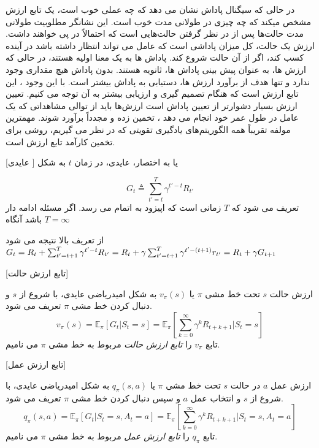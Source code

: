 در حالی که سیگنال پاداش نشان می دهد که چه عملی خوب است، یک تابع ارزش مشخص می\nf کند که چه چیزی در طولانی مدت خوب است. این نشانگر مطلوبیت طولانی مدت حالت‌ها پس از در نظر گرفتن حالت‌هایی است که احتمالاً در پی خواهند داشت.
ارزش یک حالت، کل میزان پاداشی است که عامل می تواند انتظار داشته باشد در آینده کسب کند، اگر از آن حالت شروع کند.
پاداش ها به یک معنا اولیه هستند، در حالی که ارزش ها، به عنوان پیش بینی پاداش ها، ثانویه هستند. بدون پاداش هیچ مقداری وجود ندارد و تنها هدف از برآورد ارزش ها، دستیابی به پاداش بیشتر است. با این وجود ، این تابع ارزش است که هنگام تصمیم گیری و ارزیابی بیشتر به آن توجه می کنیم.
تعیین ارزش‌ بسیار دشوارتر از تعیین پاداش است
ارزش‌ها باید از توالی مشاهداتی که یک عامل در طول عمر خود انجام می دهد ، تخمین زده و مجدداً برآورد شوند.
مهمترین مولفه تقریباً همه الگوریتم‌های یادگیری تقویتی که در نظر می گیریم، روشی برای تخمین کارآمد تابع ارزش است.

[عایدی ]
 یا به اختصار، عایدی، در زمان $t$ به شکل

$$G_t \triangleq \sum_{t'=t}^{T} \gamma^{t'-t} R_{t'}$$
تعریف می شود که $T$ زمانی است که اپیزود به اتمام می رسد. اگر مسئله ادامه دار باشد آنگاه 
$T=\infty$

از تعریف بالا نتیجه می شود 
$G_t = R_t + \sum_{t'=t+1}^{T} \gamma^{t'-t} R_{t'} \\
= R_t + \gamma \sum_{t'=t+1}^{T} \gamma^{t' - (t+1)} r_{t'} \\
= R_t + \gamma G_{t+1} \\
$

[تابع ارزش حالت]

 ارزش حالت $s$ تحت خط مشی $\pi$ یا $v_\pi(s)$ به شکل امیدریاضی عایدی، با شروع از $s$ و دنبال کردن خط مشی $\pi$ تعریف می شود.
$$v_\pi(s) = \mathbb{E}_\pi\left[G_t| S_t=s\right] = \mathbb{E}_\pi\left[\sum_{k=0}^{\infty} \gamma^k R_{t+k+1}|S_t =s \right]$$
تابع $v_\pi$ را 
\textit{تابع ارزش حالت}
 مربوط به خط مشی 
$\pi$
می نامیم.

[تابع ارزش عمل]

ارزش عمل  $a$ در حالت
$s$
 تحت خط مشی $\pi$ یا 
 $q_\pi(s,a)$
  به شکل امیدریاضی عایدی، با شروع از $s$ و انتخاب عمل $a$  و سپس دنبال کردن خط مشی $\pi$ تعریف می شود.
$$q_\pi(s,a) = \mathbb{E}_\pi\left[G_t| S_t=s, A_t=a\right] = \mathbb{E}_\pi\left[\sum_{k=0}^{\infty} \gamma^k R_{t+k+1}|S_t =s, A_t=a \right]$$
تابع $q_\pi$ را 
\textit{تابع ارزش عمل}
 مربوط به خط مشی 
$\pi$
می نامیم.



